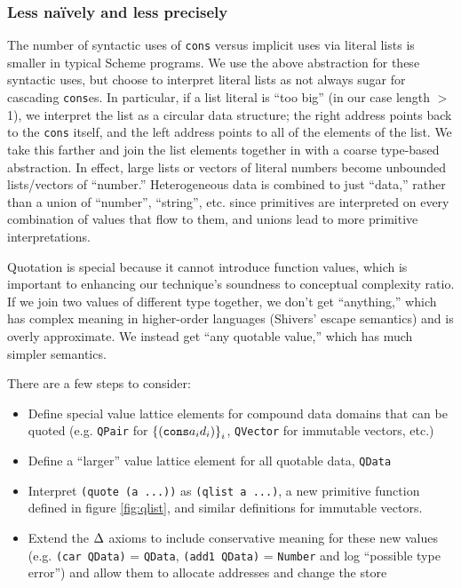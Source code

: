 \documentclass[preprint,onecolumn,9pt]{sigplanconf} %
\begin{document}
\subsubsection{Less na\"ively and less precisely}

The number of syntactic uses of {\tt cons} versus implicit uses via
literal lists is smaller in typical Scheme programs. We use the above
abstraction for these syntactic uses, but choose to interpret literal
lists as not always sugar for cascading {\tt cons}es. In particular,
if a list literal is ``too big'' (in our case length $>$ 1), we
interpret the list as a circular data structure; the right address
points back to the {\tt cons} itself, and the left address points to
all of the elements of the list. We take this farther and join the
list elements together in with a coarse type-based abstraction. In
effect, large lists or vectors of literal numbers become unbounded
lists/vectors of ``number.'' Heterogeneous data is combined to just
``data,'' rather than a union of ``number'', ``string'', etc. since
primitives are interpreted on every combination of values that flow to
them, and unions lead to more primitive interpretations.

Quotation is special because it cannot introduce function values,
which is important to enhancing our technique's soundness to
conceptual complexity ratio. If we join two values of different type
together, we don't get ``anything,'' which has complex meaning in
higher-order languages (Shivers' escape semantics) and is overly
approximate. We instead get ``any quotable value,'' which has much
simpler semantics.

There are a few steps to consider:
\begin{itemize}
 \item{Define special value lattice elements for compound data domains that can be quoted
       (e.g. {\tt QPair} for $\left\{ ({\tt cons} a_i d_i)\right\}_i$, {\tt QVector} for immutable vectors, etc.)}
 \item{Define a ``larger'' value lattice element for all quotable data, {\tt QData}}
 \item{Interpret {\tt (quote (a ...))} as {\tt (qlist a ...)}, a new primitive function defined in figure \ref{fig:qlist},
       and similar definitions for immutable vectors.}
 \item{Extend the $\Delta$ axioms to include conservative
   meaning for these new values (e.g. {\tt (car QData)} = {\tt QData},
   {\tt (add1 QData)} = {\tt Number} and log ``possible type error'')
   and allow them to allocate addresses and change the store}
\end{itemize}
\end{document}
